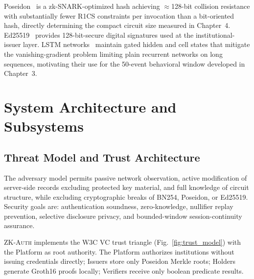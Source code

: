 \documentclass[12pt,a4paper,oneside]{report}
\begin{document}
Poseidon~\cite{poseidon} is a zk-SNARK-optimized hash achieving
$\approx$128-bit collision resistance with substantially fewer R1CS
constraints per invocation than a bit-oriented hash, directly determining
the compact circuit size measured in Chapter~4. Ed25519~\cite{bernstein2011}
provides 128-bit-secure digital signatures used at the institutional-
issuer layer. LSTM networks~\cite{hochreiter97} maintain gated hidden and
cell states that mitigate the vanishing-gradient problem limiting plain
recurrent networks on long sequences, motivating their use for the
50-event behavioral window developed in Chapter~3.

\chapter{System Architecture and Subsystems}

\section{Threat Model and Trust Architecture}

The adversary model permits passive network observation, active
modification of server-side records excluding protected key material, and
full knowledge of circuit structure, while excluding cryptographic breaks
of BN254, Poseidon, or Ed25519. Security goals are: authentication
soundness, zero-knowledge, nullifier replay prevention, selective
disclosure privacy, and bounded-window session-continuity assurance.

\textsc{ZK-Auth} implements the W3C VC trust triangle
(Fig.~\ref{fig:trust_model}) with the Platform as root authority. The
Platform authorizes institutions without issuing credentials directly;
Issuers store only Poseidon Merkle roots; Holders generate Groth16 proofs
locally; Verifiers receive only boolean predicate results.
\end{document}
